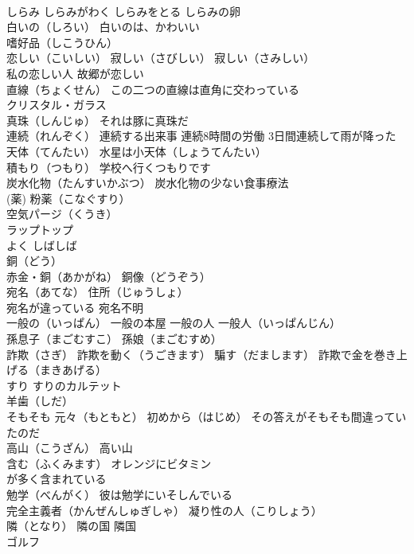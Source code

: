 \documentclass[8pt]{extreport}
\begin{document}
\begin{CJK}{UTF8}{min}
\\	しらみ しらみがわく しらみをとる しらみの卵
\\	白いの（しろい） 白いのは、かわいい
\\	嗜好品（しこうひん）
\\	恋しい（こいしい） 寂しい（さびしい） 寂しい（さみしい） 
\\	私の恋しい人 故郷が恋しい
\\	直線（ちょくせん） この二つの直線は直角に交わっている
\\	クリスタル・ガラス
\\	真珠（しんじゅ） それは豚に真珠だ
\\	連続（れんぞく） 連続する出来事 連続8時間の労働 3日間連続して雨が降った
\\	天体（てんたい） 水星は小天体（しょうてんたい）
\\	積もり（つもり） 学校へ行くつもりです
\\	炭水化物（たんすいかぶつ） 炭水化物の少ない食事療法
\\	(薬)	粉薬（こなぐすり）
\\	空気パージ（くうき）
\\	ラップトップ
\\	よく しばしば
\\	銅（どう） 
\\	赤金・銅（あかがね） 銅像（どうぞう）
\\	宛名（あてな） 住所（じゅうしょ）
\\	宛名が違っている 宛名不明
\\	一般の（いっぱん） 一般の本屋 一般の人 一般人（いっぱんじん）
\\	孫息子（まごむすこ） 孫娘（まごむすめ）
\\	詐欺（さぎ） 詐欺を動く（うごきます） 騙す（だまします） 詐欺で金を巻き上げる（まきあげる）
\\	すり すりのカルテット
\\	羊歯（しだ）
\\	そもそも 元々（もともと） 初めから（はじめ） その答えがそもそも間違っていたのだ
\\	高山（こうざん） 高い山
\\	含む（ふくみます） オレンジにビタミン
\\	が多く含まれている
\\	勉学（べんがく） 彼は勉学にいそしんでいる
\\	完全主義者（かんぜんしゅぎしゃ） 凝り性の人（こりしょう）
\\	隣（となり） 隣の国 隣国
\\	ゴルフ

\end{CJK}
\end{document}

